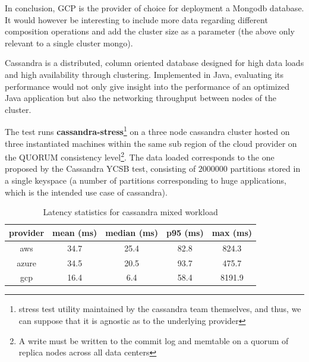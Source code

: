 \documentclass[11pt]{article}
\begin{document}
In conclusion, GCP is the provider of choice for deployment a Mongodb database. It would however be interesting to include more data regarding different composition operations and add the cluster size as a parameter (the above only relevant to a single cluster mongo).


\vspace{-5mm}\hspace{5mm} Cassandra is a distributed, column oriented database designed for high data loads and high availability through clustering. Implemented in Java, evaluating its performance would not only give insight into the performance of an optimized Java application but also the networking throughput between nodes of the cluster. 

The test runs \textbf{cassandra-stress}\footnote{stress test utility maintained by the cassandra team themselves, and thus, we can suppose that it is agnostic as to the underlying provider} on a three node cassandra cluster hosted on three instantiated machines within the same sub region of the cloud provider on the QUORUM consistency level\footnote{A write must be written to the commit log and memtable on a quorum of replica nodes across all data centers}.  The data loaded corresponds to the one proposed by the Cassandra YCSB test, consisting of $2000000$ partitions stored in a single keyspace (a number of partitions corresponding to huge applications, which is the intended use case of cassandra).  

\begin{table}[h]
\centering
\begin{tabular}{|c|c|c|c|c|}
\hline
\textbf{provider} & \textbf{mean (ms)} & \textbf{median (ms)} & \textbf{p95 (ms)} & \textbf{max (ms)} \\ \hline
aws               & 34.7               & 25.4                 & 82.8              & 824.3             \\ \hline
azure             & 34.5               & 20.5                 & 93.7              & 475.7             \\ \hline
gcp               & 16.4               & 6.4                  & 58.4              & 8191.9            \\ \hline
\end{tabular}
\caption{Latency statistics for cassandra mixed workload}
\label{tab:bench_cassandra}
\end{table}
\end{document}
